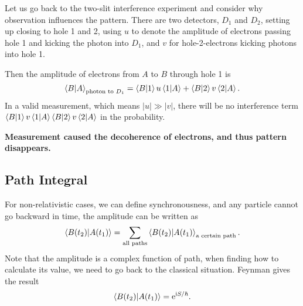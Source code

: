 Let us go back to the two-slit interference experiment and consider why observation influences the pattern. There are two detectors, $D_1$ and $D_2$, setting up closing to hole 1 and 2, using $u$ to denote the amplitude of electrons passing hole 1 and kicking the photon into $D_1$, and $v$ for hole-2-electrons kicking photons into hole 1.

Then the amplitude of electrons from $A$ to $B$ through hole 1 is
\begin{equation}
  \bra{B}\ket{A}_{\text{photon to $D_1$}} = \bra{B}\ket{1}u\bra{1}\ket{A} + \bra{B}\ket{2}v\bra{2}\ket{A}.
\end{equation}
In a valid measurement, which means $|u|\gg |v|$, there will be no interference term $\bra{B}\ket{1}v\bra{1}\ket{A} \bra{B}\ket{2}v\bra{2}\ket{A}$ in the probability.

\textbf{Measurement caused the decoherence of electrons, and thus pattern disappears.}

\subsection[路径积分]{Path Integral}
For non-relativistic cases, we can define synchronousness, and any particle cannot go backward in time, the amplitude can be written as
\begin{equation}
  \bra{B(t_2)}\ket{A(t_1)} = \sum_{\text{all paths}} \bra{B(t_2)}\ket{A(t_1)}_{\text{a certain path}}.
\end{equation}
Note that the amplitude is a complex function of path, when finding how to calculate its value, we need to go back to the classical situation. Feynman gives the result
\begin{equation}
  \bra{B(t_2)}\ket{A(t_1)} = \mathrm{e}^{\mathrm{i} S / \hbar}.
\end{equation}